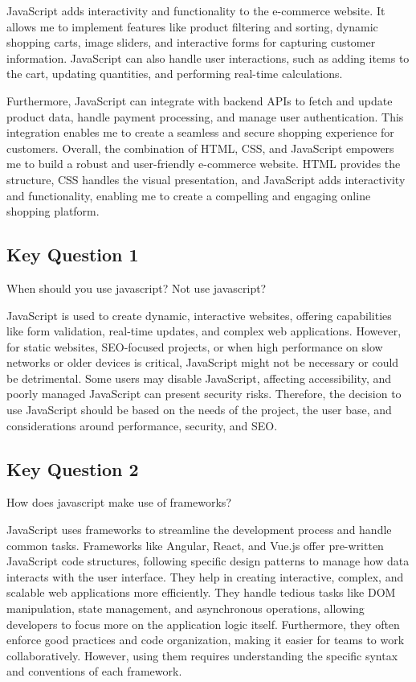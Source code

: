 \documentclass[a4paper, 11pt]{report}
\begin{document}
JavaScript adds interactivity and functionality to the e-commerce website. It allows me to implement features like product filtering and sorting, dynamic shopping carts, image sliders, and interactive forms for capturing customer information. JavaScript can also handle user interactions, such as adding items to the cart, updating quantities, and performing real-time calculations.

Furthermore, JavaScript can integrate with backend APIs to fetch and update product data, handle payment processing, and manage user authentication. This integration enables me to create a seamless and secure shopping experience for customers.
Overall, the combination of HTML, CSS, and JavaScript empowers me to build a robust and user-friendly e-commerce website. HTML provides the structure, CSS handles the visual presentation, and JavaScript adds interactivity and functionality, enabling me to create a compelling and engaging online shopping platform.

\subsection{Key Question 1}
When should you use javascript? Not use javascript?

JavaScript is used to create dynamic, interactive websites, offering capabilities like form validation, real-time updates, and complex web applications. However, for static websites, SEO-focused projects, or when high performance on slow networks or older devices is critical, JavaScript might not be necessary or could be detrimental. Some users may disable JavaScript, affecting accessibility, and poorly managed JavaScript can present security risks. Therefore, the decision to use JavaScript should be based on the needs of the project, the user base, and considerations around performance, security, and SEO.


\subsection{Key Question 2}
How does javascript make use of frameworks?

JavaScript uses frameworks to streamline the development process and handle common tasks. Frameworks like Angular, React, and Vue.js offer pre-written JavaScript code structures, following specific design patterns to manage how data interacts with the user interface. They help in creating interactive, complex, and scalable web applications more efficiently. They handle tedious tasks like DOM manipulation, state management, and asynchronous operations, allowing developers to focus more on the application logic itself. Furthermore, they often enforce good practices and code organization, making it easier for teams to work collaboratively. However, using them requires understanding the specific syntax and conventions of each framework.
\end{document}
